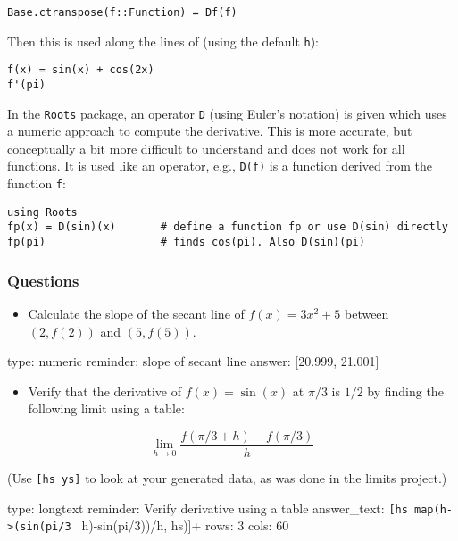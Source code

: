 \documentclass[12pt]{article}
\begin{document}
\begin{verbatim}
Base.ctranspose(f::Function) = Df(f) 
\end{verbatim}
Then this is used along the lines of (using the default \texttt{h}):



\begin{verbatim}
f(x) = sin(x) + cos(2x)
f'(pi)  
\end{verbatim}
In the \texttt{Roots} package, an operator \texttt{D} (using Euler's
notation) is given which uses a numeric approach to compute the
derivative. This is more accurate, but conceptually a bit more difficult
to understand and does not work for all functions. It is used like an
operator, e.g., \texttt{D(f)} is a function derived from the function
\texttt{f}:



\begin{verbatim}
using Roots
fp(x) = D(sin)(x)       # define a function fp or use D(sin) directly
fp(pi)                  # finds cos(pi). Also D(sin)(pi)
\end{verbatim}
\subsubsection{Questions}

\begin{itemize}
\itemsep1pt\parskip0pt
\item
  Calculate the slope of the secant line of $f(x) = 3x^2 + 5$ between
  $(2,f(2))$ and $(5, f(5))$.
\end{itemize}

\begin{answer}
    type: numeric
    reminder: slope of secant line
    answer: [20.999, 21.001]

\end{answer}

\begin{itemize}
\itemsep1pt\parskip0pt
\item
  Verify that the derivative of $f(x) = \sin(x)$ at $\pi/3$ is $1/2$ by
  finding the following limit using a table:
\end{itemize}

\[
\lim_{h \rightarrow 0} \frac{f(\pi/3 + h) - f(\pi/3)}{h}
\]

(Use \texttt{{[}hs ys{]}} to look at your generated data, as was done in
the limits project.)

\begin{answer}
type: longtext
reminder: Verify derivative using a table
answer_text: \verb+[hs map(h->(sin(pi/3 + h)-sin(pi/3))/h, hs)]+ 
rows: 3
cols: 60
\end{answer}
\end{document}
